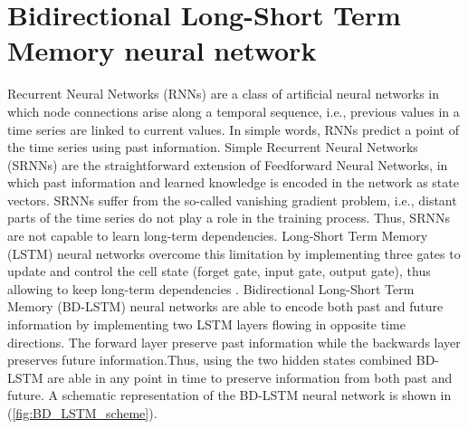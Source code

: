 \section{Bidirectional Long-Short Term Memory neural network}

Recurrent Neural Networks (RNNs) are a class of artificial neural networks
in which node connections arise along a temporal sequence, i.e., previous
values
in a time series are linked to current values. In simple words, RNNs predict a
point of the time series using past information. Simple Recurrent Neural
Networks (SRNNs) are the straightforward extension of Feedforward Neural
Networks, in which past information and learned knowledge is encoded in the
network as state vectors. SRNNs suffer from the so-called vanishing gradient
problem, i.e., distant parts of the time series do not play a role in the
training process. Thus, SRNNs are not capable to learn long-term dependencies.
Long-Short Term Memory (LSTM) neural networks overcome this limitation by
implementing three gates to update and control the cell state (forget gate,
input gate, output gate), thus allowing to keep long-term dependencies
\cite{LSTM_NN}. Bidirectional Long-Short Term Memory (BD-LSTM) neural networks
are able to encode both past and future information by implementing two LSTM
layers flowing in opposite time directions. The forward layer preserve past
information while the backwards layer preserves future information.Thus, using
the two hidden states combined BD-LSTM are able in any point in time to
preserve information from both past and future. A schematic representation of
the BD-LSTM neural network is shown in (\cref{fig:BD_LSTM_scheme}).

